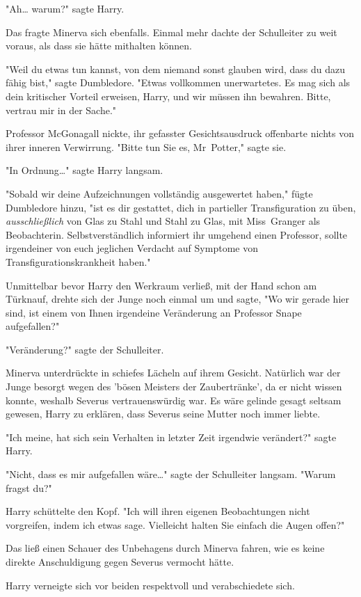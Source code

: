 {"Ah… warum?" sagte Harry.

Das fragte Minerva sich ebenfalls. Einmal mehr dachte der Schulleiter zu weit voraus, als dass sie hätte mithalten können.

"Weil du etwas tun kannst, von dem niemand sonst glauben wird, dass du dazu fähig bist," sagte Dumbledore. "Etwas vollkommen unerwartetes. Es mag sich als dein kritischer Vorteil erweisen, Harry, und wir müssen ihn bewahren. Bitte, vertrau mir in der Sache."

Professor McGonagall nickte, ihr gefasster Gesichtsausdruck offenbarte nichts von ihrer inneren Verwirrung. "Bitte tun Sie es, Mr~Potter," sagte sie.

"In Ordnung…" sagte Harry langsam.

"Sobald wir deine Aufzeichnungen vollständig ausgewertet haben," fügte Dumbledore hinzu, "ist es dir gestattet, dich in partieller Transfiguration zu üben, \emph{ausschließlich} von Glas zu Stahl und Stahl zu Glas, mit Miss~Granger als Beobachterin. Selbstverständlich informiert ihr umgehend einen Professor, sollte irgendeiner von euch jeglichen Verdacht auf Symptome von Transfigurationskrankheit haben."

Unmittelbar bevor Harry den Werkraum verließ, mit der Hand schon am Türknauf, drehte sich der Junge noch einmal um und sagte, "Wo wir gerade hier sind, ist einem von Ihnen irgendeine Veränderung an Professor Snape aufgefallen?"

"Veränderung?" sagte der Schulleiter.

Minerva unterdrückte in schiefes Lächeln auf ihrem Gesicht. Natürlich war der Junge besorgt wegen des 'bösen Meisters der Zaubertränke', da er nicht wissen konnte, weshalb Severus vertrauenswürdig war. Es wäre gelinde gesagt seltsam gewesen, Harry zu erklären, dass Severus seine Mutter noch immer liebte.

"Ich meine, hat sich sein Verhalten in letzter Zeit irgendwie verändert?" sagte Harry.

"Nicht, dass es mir aufgefallen wäre…" sagte der Schulleiter langsam. "Warum fragst du?"

Harry schüttelte den Kopf. "Ich will ihren eigenen Beobachtungen nicht vorgreifen, indem ich etwas sage. Vielleicht halten Sie einfach die Augen offen?"

Das ließ einen Schauer des Unbehagens durch Minerva fahren, wie es keine direkte Anschuldigung gegen Severus vermocht hätte.

Harry verneigte sich vor beiden respektvoll und verabschiedete sich.

}
